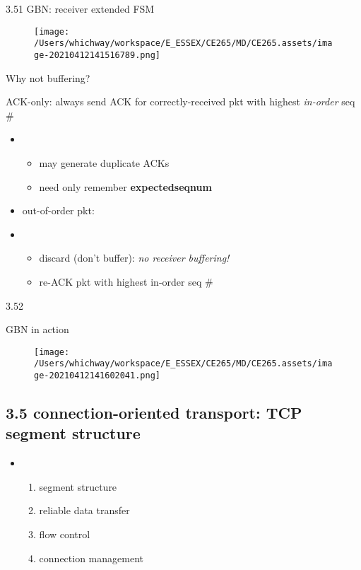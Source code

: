\documentclass[
]{article}
\begin{document}
3.51 GBN: receiver extended FSM

\begin{figure}
\centering
\texttt{[image: /Users/whichway/workspace/E\_ESSEX/CE265/MD/CE265.assets/image-20210412141516789.png]}
\caption{}
\end{figure}

Why not buffering?

ACK-only: always send ACK for correctly-received pkt with highest
\emph{in-order} seq \#

\begin{itemize}
\item
  \begin{itemize}
  \item
    may generate duplicate ACKs
  \item
    need only remember \textbf{expectedseqnum}
  \end{itemize}
\item
  out-of-order pkt:
\item
  \begin{itemize}
  \item
    discard (don't buffer): \emph{no receiver buffering!}
  \item
    re-ACK pkt with highest in-order seq \#
  \end{itemize}
\end{itemize}

3.52

GBN in action

\begin{figure}
\centering
\texttt{[image: /Users/whichway/workspace/E\_ESSEX/CE265/MD/CE265.assets/image-20210412141602041.png]}
\caption{}
\end{figure}

\hypertarget{35-connection-oriented-transport-tcp-segment-structure}{%
\subsection{3.5 connection-oriented transport: TCP segment
structure}\label{35-connection-oriented-transport-tcp-segment-structure}}

\begin{itemize}
\item
  \begin{enumerate}
  \def\labelenumi{\arabic{enumi}.}
  \item
    segment structure
  \item
    reliable data transfer
  \item
    flow control
  \item
    connection management
  \end{enumerate}
\end{itemize}
\end{document}
